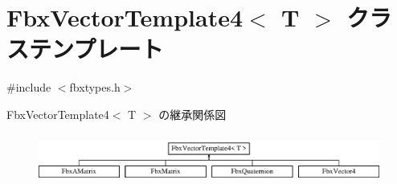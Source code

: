 \hypertarget{class_fbx_vector_template4}{}\section{Fbx\+Vector\+Template4$<$ T $>$ クラステンプレート}
\label{class_fbx_vector_template4}


{\ttfamily \#include $<$fbxtypes.\+h$>$}

Fbx\+Vector\+Template4$<$ T $>$ の継承関係図\begin{figure}[H]
\begin{center}
\leavevmode
\includegraphics[height=1.676647cm]{class_fbx_vector_template4}
\end{center}
\end{figure}
